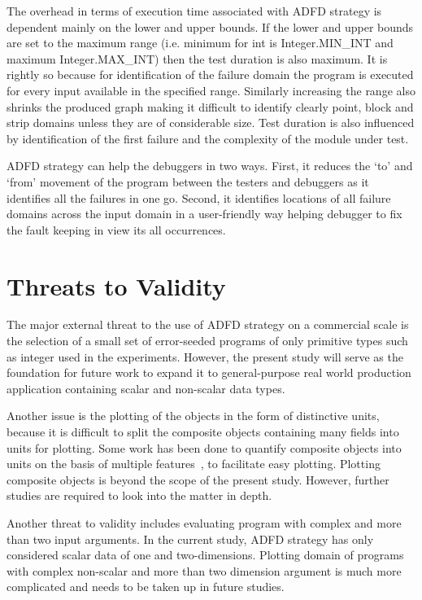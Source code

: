 The overhead in terms of execution time associated with ADFD strategy is dependent mainly on the lower and upper bounds. If the lower and upper bounds are set to the maximum range (i.e. minimum for int is Integer.MIN\_INT and maximum Integer.MAX\_INT) then the test duration is also maximum. It is rightly so because for identification of the failure domain the program is executed for every input available in the specified range. Similarly increasing the range also shrinks the produced graph making it difficult to identify clearly point, block and strip domains unless they are of considerable size. Test duration is also influenced by identification of the first failure and the complexity of the module under test.

ADFD strategy can help the debuggers in two ways. First, it reduces the `to' and `from' movement of the program between the testers and debuggers as it identifies all the failures in one go. Second, it identifies locations of all failure domains across the input domain in a user-friendly way helping debugger to fix the fault keeping in view its all occurrences.


\section{Threats to Validity} \label{sec:validity}
The major external threat to the use of ADFD strategy on a commercial scale is the selection of a small set of error-seeded programs of only primitive types such as integer used in the experiments. However, the present study will serve as the foundation for future work to expand it to general-purpose real world production application containing scalar and non-scalar data types.

Another issue is the plotting of the objects in the form of distinctive units, because it is difficult to split the composite objects containing many fields into units for plotting. Some work has been done to quantify composite objects into units on the basis of multiple features~\cite{ciupa2006object}, to facilitate easy plotting. Plotting composite objects is beyond the scope of the present study. However, further studies are required to look into the matter in depth. 

Another threat to validity includes evaluating program with complex and more than two input arguments. In the current study, ADFD strategy has only considered scalar data of one and two-dimensions. Plotting domain of programs with complex non-scalar and more than two dimension argument is much more complicated and needs to be taken up in future studies.

